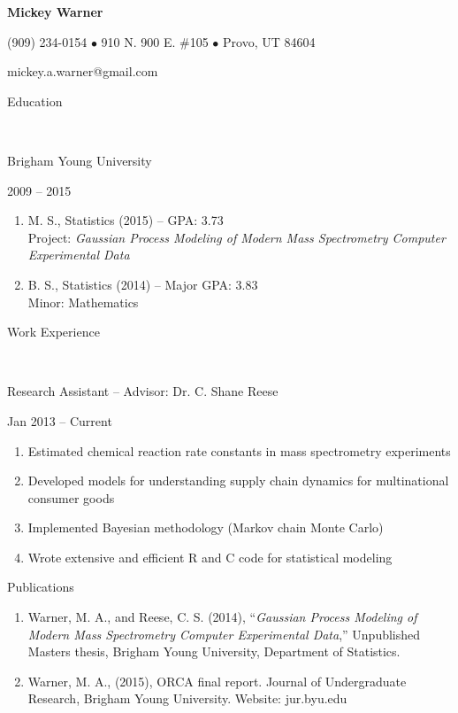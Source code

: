 \documentclass[12pt]{article}
\newcommand{\head}[1]{ %
    \bigskip %
    \bigskip %
    \begin{Large}\begin{bf}{#1}\end{bf}\end{Large} %

    \ \\ [-1.3cm] %

    \hrulefill}
\newcommand{\subhead}[1]{\begin{sc}{#1}\end{sc}}
\begin{document}

\centerline{ \Huge \bf Mickey Warner }
\smallskip
\centerline{ (909) 234-0154 $\bullet$ 910 N. 900 E. \#105 $\bullet$ Provo, UT 84604 }
\smallskip
\centerline{ mickey.a.warner@gmail.com }
\bigskip


\head{Education}

\subhead{Brigham Young University} \hfill 2009 -- 2015

\begin{enumerate}[label=$\cdot$, rightmargin=1.5cm]
\item M. S., Statistics (2015) -- GPA: 3.73 \\
Project: \emph{Gaussian Process Modeling of Modern Mass Spectrometry Computer Experimental Data}
\item B. S., Statistics (2014) -- Major GPA: 3.83 \\
Minor: Mathematics
\end{enumerate}

\head{Work Experience}

\subhead{Research Assistant -- Advisor: Dr. C. Shane Reese} \hfill Jan 2013 -- Current

\begin{enumerate}[label=$\cdot$, rightmargin=1.5cm]
\item Estimated chemical reaction rate constants in mass spectrometry experiments
\item Developed models for understanding supply chain dynamics for multinational consumer goods
\item Implemented Bayesian methodology (Markov chain Monte Carlo)
\item Wrote extensive and efficient R and C code for statistical modeling
\end{enumerate}

\subhead{Publications}

\begin{enumerate}[label=$\cdot$, rightmargin=1.5cm]
\item Warner, M. A., and Reese, C. S. (2014), ``\emph{Gaussian Process Modeling of Modern Mass Spectrometry Computer Experimental Data},'' Unpublished Masters thesis, Brigham Young University, Department of Statistics.
\item Warner, M. A., (2015), ORCA final report. Journal of Undergraduate Research, Brigham Young University. Website: jur.byu.edu
\end{enumerate}
\end{document}

